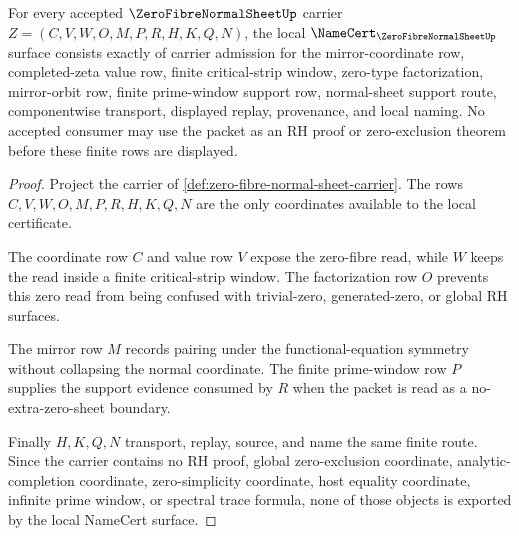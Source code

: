 \begin{theorem}
\label{thm:zero-fibre-normal-sheet-namecert-obligations}
For every accepted $\ZeroFibreNormalSheetUp$ carrier $Z=(C,V,W,O,M,P,R,H,K,Q,N)$, the local $\NameCert_{\ZeroFibreNormalSheetUp}$ surface consists exactly of carrier admission for the mirror-coordinate row, completed-zeta value row, finite critical-strip window, zero-type factorization, mirror-orbit row, finite prime-window support row, normal-sheet support route, componentwise transport, displayed replay, provenance, and local naming. No accepted consumer may use the packet as an RH proof or zero-exclusion theorem before these finite rows are displayed.
\end{theorem}
\begin{proof}
Project the carrier of \autoref{def:zero-fibre-normal-sheet-carrier}. The rows $C,V,W,O,M,P,R,H,K,Q,N$ are the only coordinates available to the local certificate.

The coordinate row $C$ and value row $V$ expose the zero-fibre read, while $W$ keeps the read inside a finite critical-strip window. The factorization row $O$ prevents this zero read from being confused with trivial-zero, generated-zero, or global RH surfaces.

The mirror row $M$ records pairing under the functional-equation symmetry without collapsing the normal coordinate. The finite prime-window row $P$ supplies the support evidence consumed by $R$ when the packet is read as a no-extra-zero-sheet boundary.

Finally $H,K,Q,N$ transport, replay, source, and name the same finite route. Since the carrier contains no RH proof, global zero-exclusion coordinate, analytic-completion coordinate, zero-simplicity coordinate, host equality coordinate, infinite prime window, or spectral trace formula, none of those objects is exported by the local NameCert surface.
\end{proof}

